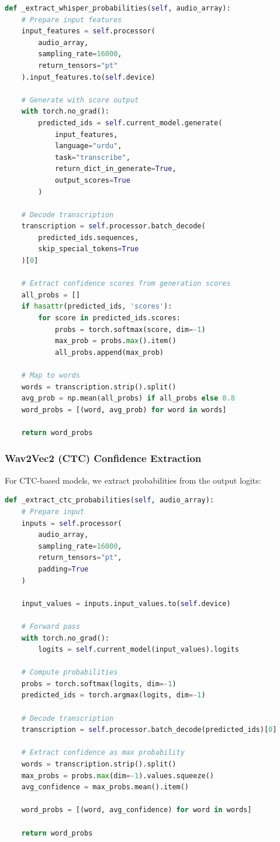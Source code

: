 \begin{lstlisting}[language=Python, caption=Whisper Confidence Extraction]
def _extract_whisper_probabilities(self, audio_array):
    # Prepare input features
    input_features = self.processor(
        audio_array, 
        sampling_rate=16000, 
        return_tensors="pt"
    ).input_features.to(self.device)
    
    # Generate with score output
    with torch.no_grad():
        predicted_ids = self.current_model.generate(
            input_features,
            language="urdu",
            task="transcribe",
            return_dict_in_generate=True,
            output_scores=True
        )
    
    # Decode transcription
    transcription = self.processor.batch_decode(
        predicted_ids.sequences, 
        skip_special_tokens=True
    )[0]
    
    # Extract confidence scores from generation scores
    all_probs = []
    if hasattr(predicted_ids, 'scores'):
        for score in predicted_ids.scores:
            probs = torch.softmax(score, dim=-1)
            max_prob = probs.max().item()
            all_probs.append(max_prob)
    
    # Map to words
    words = transcription.strip().split()
    avg_prob = np.mean(all_probs) if all_probs else 0.8
    word_probs = [(word, avg_prob) for word in words]
    
    return word_probs
\end{lstlisting}

\subsubsection{Wav2Vec2 (CTC) Confidence Extraction}

For CTC-based models, we extract probabilities from the output logits:

\begin{lstlisting}[language=Python, caption=CTC Confidence Extraction]
def _extract_ctc_probabilities(self, audio_array):
    # Prepare input
    inputs = self.processor(
        audio_array,
        sampling_rate=16000,
        return_tensors="pt",
        padding=True
    )
    
    input_values = inputs.input_values.to(self.device)
    
    # Forward pass
    with torch.no_grad():
        logits = self.current_model(input_values).logits
    
    # Compute probabilities
    probs = torch.softmax(logits, dim=-1)
    predicted_ids = torch.argmax(logits, dim=-1)
    
    # Decode transcription
    transcription = self.processor.batch_decode(predicted_ids)[0]
    
    # Extract confidence as max probability
    words = transcription.strip().split()
    max_probs = probs.max(dim=-1).values.squeeze()
    avg_confidence = max_probs.mean().item()
    
    word_probs = [(word, avg_confidence) for word in words]
    
    return word_probs
\end{lstlisting}

